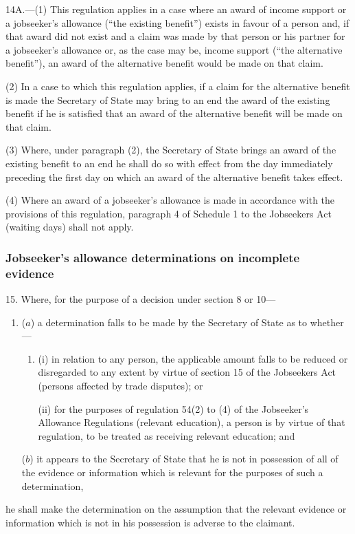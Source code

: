 \documentclass[12pt,a4paper]{article}
\begin{document}
14A.---(1)  This regulation applies in a case where an award of income support or a jobseeker’s allowance (“the existing benefit”) exists in favour of a person and, if that award did not exist and a claim was made by that person or his partner for a jobseeker’s allowance or, as the case may be, income support (“the alternative benefit”), an award of the alternative benefit would be made on that claim.

(2) In a case to which this regulation applies, if a claim for the alternative benefit is made the Secretary of State may bring to an end the award of the existing benefit if he is satisfied that an award of the alternative benefit will be made on that claim.

(3) Where, under paragraph (2), the Secretary of State brings an award of the existing benefit to an end he shall do so with effect from the day immediately preceding the first day on which an award of the alternative benefit takes effect.

(4) Where an award of a jobseeker’s allowance is made in accordance with the provisions of this regulation, paragraph 4 of Schedule 1 to the Jobseekers Act (waiting days) shall not apply.


\subsubsection[15. Jobseeker’s allowance determinations on incomplete evidence]{Jobseeker’s allowance determinations on incomplete evidence}

15.  Where, for the purpose of a decision under section 8 or 10—
\begin{enumerate}\item[]
($a$) a determination falls to be made by the Secretary of State as to whether—
\begin{enumerate}\item[]
(i) in relation to any person, the applicable amount falls to be reduced or disregarded to any extent by virtue of section 15 of the Jobseekers Act (persons affected by trade disputes); or

(ii) for the purposes of regulation 54(2) to (4) of the Jobseeker’s Allowance Regulations (relevant education), a person is by virtue of that regulation, to be treated as receiving relevant education; and
\end{enumerate}

($b$) it appears to the Secretary of State that he is not in possession of all of the evidence or information which is relevant for the purposes of such a determination,
\end{enumerate}
he shall make the determination on the assumption that the relevant evidence or information which is not in his possession is adverse to the claimant.
\end{document}
